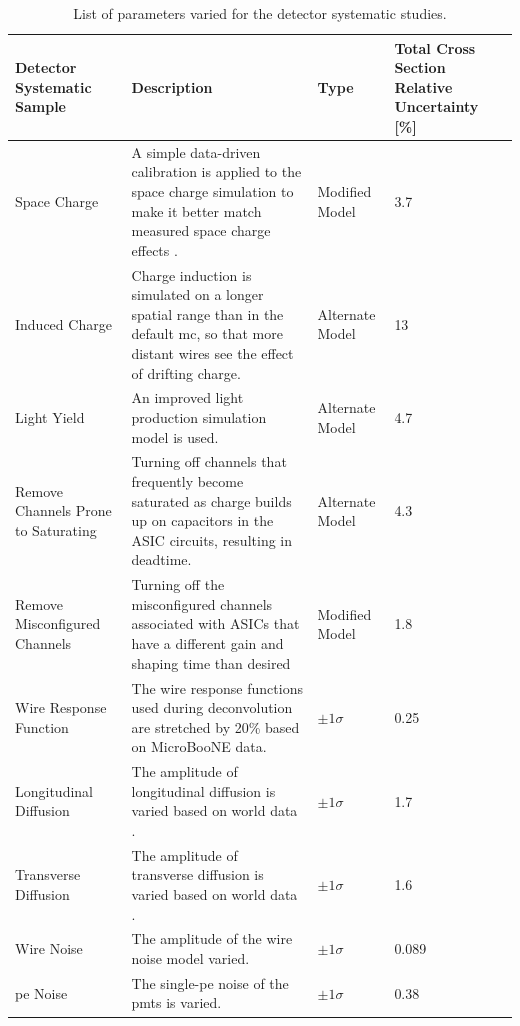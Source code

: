 \begin{table}[]
\begin{adjustwidth}{-1cm}{-1cm}
\centering%
\caption[Detector Modelling Systematic Uncertainties]{List of parameters varied for the detector systematic studies.}
\label{tab:det_syst}
\begin{tabularx}{\linewidth}{AYZB}
\toprule
Detector Systematic Sample              & Description     & Type & Total Cross Section Relative Uncertainty [\%]\\
\midrule
Space Charge                  &  A simple data-driven calibration is applied to the space charge simulation to make it better match measured space charge effects \cite{space_charge}.  & Modified Model   & 3.7  \\
Induced Charge                &  Charge induction is simulated on a longer spatial range than in the default \acrshort{mc}, so that more distant wires see the effect of drifting charge. & Alternate Model   & 13\\
Light Yield                   &  An improved light production simulation model is used.  & Alternate Model  &  4.7 \\
Remove Channels Prone to Saturating         &   Turning off channels that frequently become saturated as charge builds up on capacitors in the ASIC circuits, resulting in deadtime.  &   Alternate Model & 4.3 \\
Remove Misconfigured Channels     &  Turning off the misconfigured channels associated with ASICs that have a different gain and shaping time than desired & Modified Model & 1.8 \\
Wire Response Function        &  The wire response functions used during deconvolution are stretched by 20\% based on MicroBooNE data. & $\pm1\sigma$ & 0.25 \\
Longitudinal Diffusion        &  The amplitude of longitudinal diffusion is varied based on world data \cite{Li:2015rqa, Cennini:1994ha}.    & $\pm1\sigma$ & 1.7 \\
Transverse Diffusion          &  The amplitude of transverse diffusion is varied based on world data \cite{TD01, TD02, TD03}.   & $\pm1\sigma$ & 1.6 \\
Wire Noise                    &  The amplitude of the wire noise model varied. & $\pm1\sigma$ & 0.089 \\
\acrshort{pe} Noise                      &  The single-\acrshort{pe} noise of the \acrshort{pmt}s is varied.  & $\pm1\sigma$ & 0.38 \\

\end{tabularx}
\end{adjustwidth}
\end{table}
